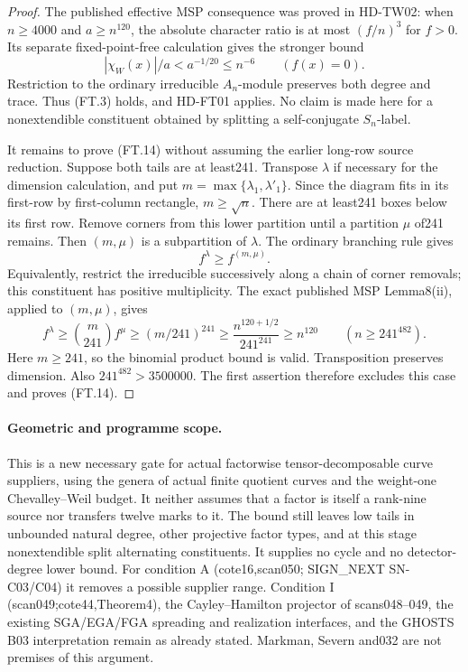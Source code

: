 \begin{proof}
The published effective MSP consequence was proved in HD-TW02:
when \(n\ge4000\) and \(a\ge n^{120}\), the absolute character ratio
is at most \((f/n)^3\) for \(f>0\).
Its separate fixed-point-free calculation gives the stronger bound
\[
             |\chi_W(x)|/a<a^{-1/20}\le n^{-6}
                         \qquad(f(x)=0).
                         \tag{FT.15}
\]
Restriction to the ordinary irreducible \(A_n\)-module preserves
both degree and trace. Thus (FT.3) holds, and HD-FT01 applies.
No claim is made here for a nonextendible constituent obtained by
splitting a self-conjugate \(S_n\)-label.

It remains to prove (FT.14) without assuming the earlier long-row
source reduction. Suppose both tails are at least241.
Transpose \(\lambda\) if necessary for the dimension calculation,
and put \(m=\max\{\lambda_1,\lambda'_1\}\).
Since the diagram fits in its first-row by first-column rectangle,
\(m\ge\sqrt n\).
There are at least241 boxes below its first row.
Remove corners from this lower partition until a partition
\(\mu\) of241 remains. Then \((m,\mu)\) is a subpartition of
\(\lambda\). The ordinary branching rule gives
\[
                 f^\lambda\ge f^{(m,\mu)}.
                 \tag{FT.16}
\]
Equivalently, restrict the irreducible successively along a chain
of corner removals; this constituent has positive multiplicity.
The exact published MSP Lemma8(ii), applied to \((m,\mu)\), gives
\[
 f^\lambda\ge\binom{m}{241}f^\mu
       \ge(m/241)^{241}
       \ge\frac{n^{120+1/2}}{241^{241}}
       \ge n^{120}
                   \qquad(n\ge241^{482}).
 \tag{FT.17}
\]
Here \(m\ge241\), so the binomial product bound is valid.
Transposition preserves dimension. Also
\(241^{482}>3500000\).
The first assertion therefore excludes this case and proves
(FT.14).
\end{proof}

\paragraph{Geometric and programme scope.}
This is a new necessary gate for actual factorwise tensor-decomposable
curve suppliers, using the genera of actual finite quotient curves and
the weight-one Chevalley--Weil budget. It neither assumes that a factor
is itself a rank-nine source nor transfers twelve marks to it.
The bound still leaves low tails in unbounded natural degree, other
projective factor types, and at this stage nonextendible split
alternating constituents.
It supplies no cycle and no detector-degree lower bound.
For condition A (cote16,scan050; SIGN_NEXT SN-C03/C04) it removes
a possible supplier range. Condition I (scan049;cote44,Theorem4),
the Cayley--Hamilton projector of scans048--049, the existing
SGA/EGA/FGA spreading and realization interfaces, and the GHOSTS B03
interpretation remain as already stated. Markman, Severn and032
are not premises of this argument.

